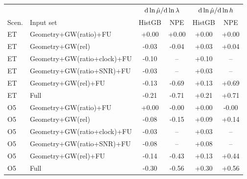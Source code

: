\begin{tabular*}{\linewidth}{@{\extracolsep{\fill}}llcccc@{}}
\toprule
 & & \multicolumn{2}{c}{${\rm d}\ln\hat\mu/{\rm d}\ln\lambda$} & \multicolumn{2}{c}{${\rm d}\ln\hat\mu/{\rm d}\ln h$} \\
Scen. & Input set & HistGB & NPE & HistGB & NPE \\
\midrule
ET & Geometry+GW(ratio)+FU & +0.00 & +0.00 & +0.00 & +0.00 \\
ET & Geometry+GW(rel) & -0.03 & -0.04 & +0.03 & +0.04 \\
ET & Geometry+GW(ratio+clock)+FU & -0.10 & -- & +0.10 & -- \\
ET & Geometry+GW(ratio+SNR)+FU & -0.03 & -- & +0.03 & -- \\
ET & Geometry+GW(rel)+FU & -0.13 & -0.69 & +0.13 & +0.69 \\
ET & Full & -0.21 & -0.71 & +0.21 & +0.71 \\
O5 & Geometry+GW(ratio)+FU & +0.00 & -0.00 & +0.00 & -0.00 \\
O5 & Geometry+GW(rel) & -0.08 & -0.15 & +0.09 & +0.14 \\
O5 & Geometry+GW(ratio+clock)+FU & -0.03 & -- & +0.03 & -- \\
O5 & Geometry+GW(ratio+SNR)+FU & -0.08 & -- & +0.08 & -- \\
O5 & Geometry+GW(rel)+FU & -0.14 & -0.43 & +0.13 & +0.44 \\
O5 & Full & -0.30 & -0.56 & +0.30 & +0.56 \\
\bottomrule
\end{tabular*}